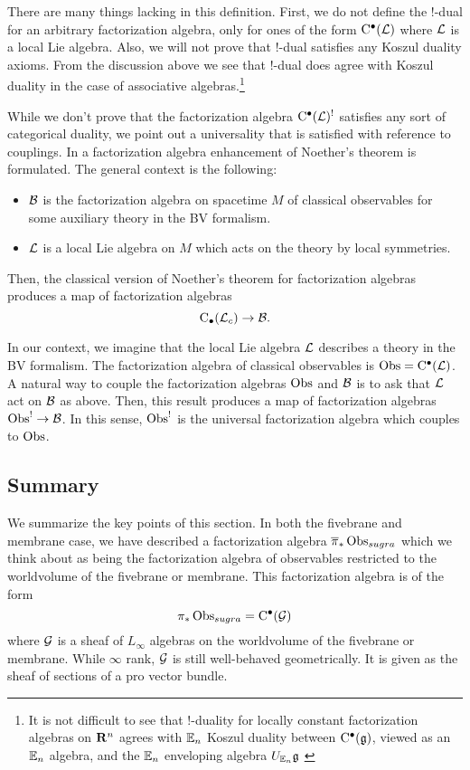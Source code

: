 There are many things lacking in this definition. 
First, we do not define the $!$-dual for an arbitrary factorization algebra, only for ones of the form ${\rm C}^\bullet(\mathcal L)$ where $\mathcal L$ is a local Lie algebra. 
Also, we will not prove that $!$-dual satisfies any Koszul duality axioms. 
From the discussion above we see that $!$-dual does agree with Koszul duality in the case of associative algebras.\footnote{It is not difficult to see that $!$-duality for locally constant factorization algebras on $\mathbf{R}^n$ agrees with $\mathbb E_n$ Koszul duality between ${\rm C}^\bullet(\mathfrak g)$, viewed as an $\mathbb E_n$ algebra, and the $\mathbb E_n$ enveloping algebra $U_{\mathbb E_n} \mathfrak g$ \cite{Knudsen, Lurie,...}}

\parsec[s:noether]

While we don't prove that the factorization algebra ${\rm C}^\bullet(\mathcal L)^!$ satisfies any sort of categorical duality, we point out a universality that is satisfied with reference to couplings.
In \cite[Part 3]{CG2} a factorization algebra enhancement of Noether's theorem is formulated. 
The general context is the following: 
\begin{itemize}
\item $\mathcal B$ is the factorization algebra on spacetime $M$ of classical observables for some auxiliary theory in the BV formalism.
\item $\mathcal L$ is a local Lie algebra on $M$ which acts on the theory by local symmetries. 
\end{itemize}
Then, the classical version of Noether's theorem for factorization algebras produces a map of factorization algebras 
\[
{\rm C}_\bullet(\mathcal L_c) \to \mathcal B .
\]

In our context, we imagine that the local Lie algebra $\mathcal L$ describes a theory in the BV formalism.
The factorization algebra of classical observables is $\operatorname{Obs} = {\rm C}^\bullet(\mathcal L)$. 
A natural way to couple the factorization algebras $\operatorname{Obs}$ and $\mathcal B$ is to ask that $\mathcal L$ act on $\mathcal B$ as above.
Then, this result produces a map of factorization algebras $\operatorname{Obs}^! \to \mathcal B$.
In this sense, $\operatorname{Obs}^!$ is the universal factorization algebra which couples to $\operatorname{Obs}$.

\subsection{Summary}
\label{sec:factsummary}

We summarize the key points of this section.
In both the fivebrane and membrane case, we have described a factorization algebra $\overline{\pi}_*\operatorname{Obs}_{sugra}$ which we think about as being the factorization algebra of observables restricted to the worldvolume of the fivebrane or membrane.
This factorization algebra is of the form 
\[
\pi_*\operatorname{Obs}_{sugra} = {\rm C}^\bullet(\mathcal G)
\]
where $\mathcal G$ is a sheaf of $L_\infty$ algebras on the worldvolume of the fivebrane or membrane.
While $\infty$ rank, $\mathcal G$ is still well-behaved geometrically. 
It is given as the sheaf of sections of a pro vector bundle. 

